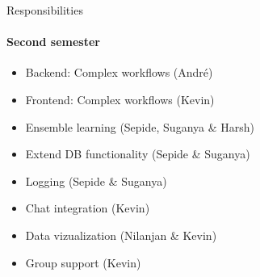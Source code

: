 \begin{frame}{Responsibilities}
\framesubtitle{Second semester}
	\begin{itemize}
		\item Backend: Complex workflows (André)
		\item Frontend: Complex workflows (Kevin)
		\item Ensemble learning  (Sepide, Suganya \& Harsh)
		\item Extend DB functionality (Sepide \& Suganya)
		\item Logging (Sepide \& Suganya)
		\item Chat integration (Kevin)
		\item Data vizualization (Nilanjan \& Kevin)
		\item Group support (Kevin)
	\end{itemize}
\end{frame}